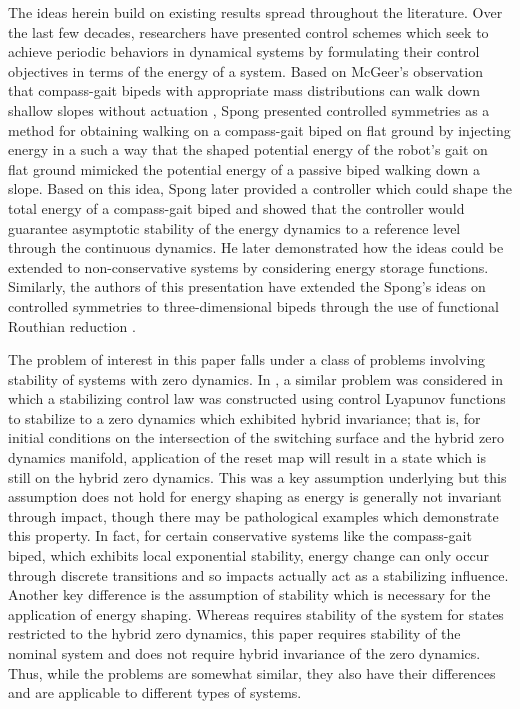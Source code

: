 \documentclass[english]{article}
\begin{document}
% 
The ideas herein build on existing results spread throughout the literature.
%
Over the last few decades, researchers have presented control schemes which seek
to achieve periodic behaviors in dynamical systems by formulating their control
objectives in terms of the energy of a system.
%
Based on McGeer's observation that compass-gait bipeds with appropriate mass
distributions can walk down shallow slopes without actuation \cite{McGeer1990},
Spong presented controlled symmetries \cite{Spong2005} as a method for obtaining
walking on a compass-gait biped on flat ground by injecting energy in a such a
way that the shaped potential energy of the robot's gait on flat ground mimicked
the potential energy of a passive biped walking down a slope.
% 
Based on this idea, Spong later provided a controller which could shape the
total energy of a compass-gait biped and showed that the controller would
guarantee asymptotic stability of the energy dynamics to a reference level
through the continuous dynamics.
%
He later demonstrated how the ideas could be extended to non-conservative
systems \cite{Spong2007} by considering energy storage functions.
%
Similarly, the authors of this presentation have extended the Spong's ideas on
controlled symmetries to three-dimensional bipeds through the use of functional
Routhian reduction \cite{Grizzle2014}.


The problem of interest in this paper falls under a class of problems involving
stability of systems with zero dynamics.
%
In \cite{Ames2014}, a similar problem was considered in which a stabilizing
control law was constructed using control Lyapunov functions to stabilize to a
zero dynamics which exhibited hybrid invariance; that is, for initial conditions
on the intersection of the switching surface and the hybrid zero dynamics
manifold, application of the reset map will result in a state which is still on
the hybrid zero dynamics.
%
This was a key assumption underlying \cite{Ames2014} but this assumption does
not hold for energy shaping as energy is generally not invariant through impact,
though there may be pathological examples which demonstrate this property.
%
In fact, for certain conservative systems like the compass-gait biped, which
exhibits local exponential stability, energy change can only occur through
discrete transitions and so impacts actually act as a stabilizing influence.
%
Another key difference is the assumption of stability which is necessary for the
application of energy shaping.
%
Whereas \cite{Ames2014} requires stability of the system for states restricted
to the hybrid zero dynamics, this paper requires stability of the nominal system
and does not require hybrid invariance of the zero dynamics.
%
Thus, while the problems are somewhat similar, they also have their differences
and are applicable to different types of systems.



\end{document}
